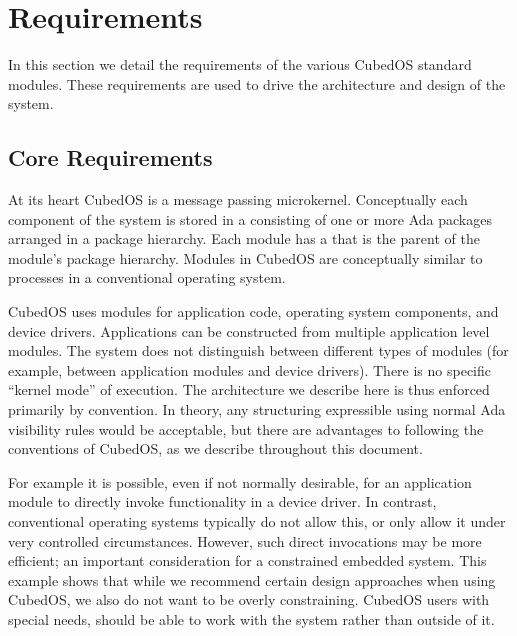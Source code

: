 
\chapter{Requirements}
\label{chapt:requirements}

In this section we detail the requirements of the various CubedOS standard modules. These
requirements are used to drive the architecture and design of the system. 

\section{Core Requirements}
\label{sec:core-requirements}

At its heart CubedOS is a message passing microkernel. Conceptually each component of the system
is stored in a  consisting of one or more Ada packages arranged in a package
hierarchy. Each module has a  that is the parent of the module's
package hierarchy. Modules in CubedOS are conceptually similar to processes in a conventional
operating system.

CubedOS uses modules for application code, operating system components, and device drivers.
Applications can be constructed from multiple application level modules. The system does not
distinguish between different types of modules (for example, between application modules and
device drivers). There is no specific ``kernel mode'' of execution. The architecture we describe
here is thus enforced primarily by convention. In theory, any structuring expressible using
normal Ada visibility rules would be acceptable, but there are advantages to following the
conventions of CubedOS, as we describe throughout this document.

For example it is possible, even if not normally desirable, for an application module to
directly invoke functionality in a device driver. In contrast, conventional operating systems
typically do not allow this, or only allow it under very controlled circumstances. However, such
direct invocations may be more efficient; an important consideration for a constrained embedded
system. This example shows that while we recommend certain design approaches when using CubedOS,
we also do not want to be overly constraining. CubedOS users with special needs, should be able
to work with the system rather than outside of it.

